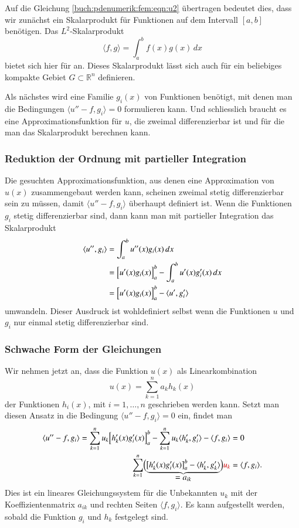 Auf die Gleichung \eqref{buch:pdenumerik:fem:eqn:u2} übertragen
bedeutet dies, dass wir zunächst ein Skalarprodukt für Funktionen
auf dem Intervall $[a,b]$ benötigen.
Das $L^2$-Skalarprodukt
\[
\langle f,g\rangle
=
\int_a^b f(x)g(x)\,dx
\]
bietet sich hier für an.
Dieses Skalarprodukt lässt sich auch für
ein beliebiges kompakte Gebiet $G\subset\mathbb{R}^n$ definieren.

Als nächstes wird eine Familie $g_i(x)$ von Funktionen benötigt, mit
denen man die Bedingungen $\langle u''-f,g_i\rangle=0$
formulieren kann.
Und schliesslich braucht es eine Approximationsfunktion für $u$, die zweimal
differenzierbar ist und für die man das Skalarprodukt berechnen kann.

%
%
\subsubsection{Reduktion der Ordnung mit partieller Integration}
Die gesuchten Approximationsfunktion, aus denen eine Approximation von
$u(x)$ zusammengebaut werden kann, scheinen zweimal stetig differenzierbar
sein zu müssen, damit $\langle u''-f,g_i\rangle$ überhaupt definiert ist.
Wenn die Funktionen $g_i$ stetig differenzierbar sind, dann kann man
mit partieller Integration das Skalarprodukt
\begin{align*}
\langle u'',g_i \rangle
&=
\int_a^b u''(x)g_i(x)\,dx
\\
&=
\Bigl[ u'(x) g_i(x) \Bigr]_a^b
-
\int_a^b u'(x) g'_i(x)\,dx
\\
&=
\Bigl[ u'(x) g_i(x)\Bigr]_a^b
-
\langle u', g'_i\rangle
\end{align*}
umwandeln.
Dieser Ausdruck ist wohldefiniert selbst wenn die Funktionen $u$ und $g_i$
nur einmal stetig differenzierbar sind.

%
%
\subsubsection{Schwache Form der Gleichungen}
Wir nehmen jetzt an, dass die Funktion $u(x)$ als Linearkombination
\[
u(x) 
=
\sum_{k=1}^n a_k h_k(x)
\]
der Funktionen $h_i(x)$, mit $i=1,\dots,n$ geschrieben werden kann.
Setzt man diesen Ansatz in die Bedingung $\langle u''-f,g_i\rangle=0$ ein,
findet man
\begin{align}
\langle u''-f,g_i\rangle
=
\sum_{k=1}^n
u_k
\Bigl[h'_k(x) g'_i(x)\Bigr]_a^b
-
\sum_{k=1}^n
u_k
\langle h'_k,g'_i\rangle
-
\langle f,g_i\rangle
&=
0
\notag
\\
\sum_{k=1}^n
\Bigl(
\underbrace{
\bigl[h'_k(x)g'_i(x)\bigr]_a^b
-
\langle h'_k,g'_k\rangle
}_{\displaystyle =  a_{ik}}
\Bigr)
{\color{darkred}u_k}
&=
\langle f,g_i\rangle.
\label{buch:pdenumerik:fem:eqn:gleichungen}
\end{align}
Dies ist ein lineares Gleichungssystem für die Unbekannten $u_k$
mit der Koeffizientenmatrix $a_{ik}$ und rechten Seiten
$\langle f,g_i\rangle$.
Es kann aufgestellt werden, sobald die Funktion $g_i$ und $h_k$ festgelegt
sind.

